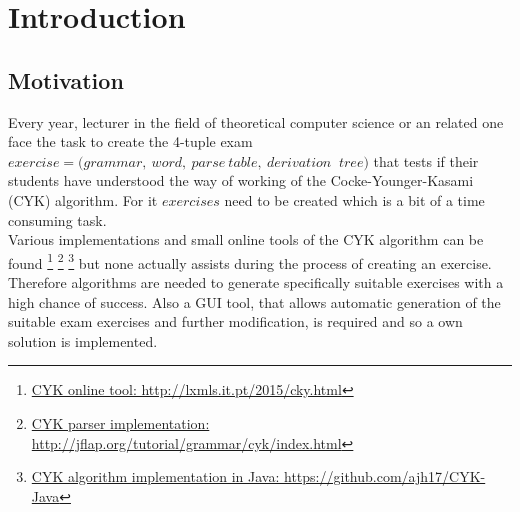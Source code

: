 
\section{Introduction}\label{Introduction}

\subsection{Motivation}
Every year, lecturer in the field of theoretical computer science or an related one face the task to create the 4-tuple exam $exercise = (grammar,\ word,\ parse\ table,\ derivation\ $ $tree)$ that tests if their students have understood the way of working of the Cocke-Younger-Kasami (CYK) algorithm. For it $exercises$ need to be created which is a bit of a time consuming task. \\
Various implementations and small online tools of the CYK algorithm can be found \footnote{\href{http://lxmls.it.pt/2015/cky.html}{CYK online tool: http://lxmls.it.pt/2015/cky.html}} \footnote{\href{http://jflap.org/tutorial/grammar/cyk/index.html}{CYK parser implementation: http://jflap.org/tutorial/grammar/cyk/index.html}} \footnote{\href{https://github.com/ajh17/CYK-Java}{CYK algorithm implementation in Java: https://github.com/ajh17/CYK-Java}} but none actually assists during the process of creating an exercise.\\
Therefore algorithms are needed to generate specifically suitable exercises with a high chance of success. Also a GUI tool, that allows automatic generation of the suitable exam exercises and further modification, is required and so a own solution is implemented.

